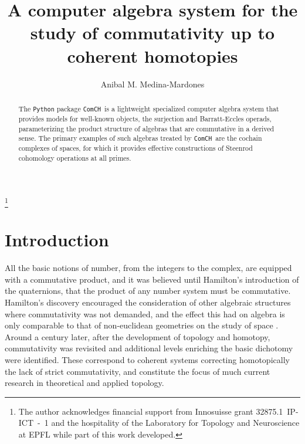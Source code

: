 \documentclass{amsart}
\newcommand{\comch}{\texttt{ComCH}}
\begin{document}
	
\title[A C.A.S. for the study of commutativity up to coherent homotopies]{A computer algebra system for the study of commutativity up to coherent homotopies}
\author{Anibal M. Medina-Mardones}
\address{Max Plank Institute for Mathematics, Bonn, Germany}
\address{Department of Mathematics, University of Notre Dame, Notre Dame, IN, USA}
\thanks{The author acknowledges financial support from Innosuisse grant \mbox{32875.1 IP-ICT - 1} and the hospitality of the Laboratory for Topology and Neuroscience at EPFL while part of this work developed.}

\begin{abstract}
	The \texttt{Python} package \comch\, is a lightweight specialized computer algebra system that provides models for well-known objects, the surjection and Barratt-Eccles operads, parameterizing the product structure of algebras that are commutative in a derived sense.
	The primary examples of such algebras treated by \comch\, are the cochain complexes of spaces, for which it provides effective constructions of Steenrod cohomology operations at all primes.
\end{abstract} 

\vspace*{-.8cm}

\maketitle

\section{Introduction}

All the basic notions of number, from the integers to the complex, are equipped with a commutative product, and it was believed until Hamilton's introduction of the quaternions, that the product of any number system must be commutative.
Hamilton's discovery encouraged the consideration of other algebraic structures where commutativity was not demanded, and the effect this had on algebra is only comparable to that of non-euclidean geometries on the study of space \cite[Ch.V]{Kline1982}.
Around a century later, after the development of topology and homotopy, commutativity was revisited and additional levels enriching the basic dichotomy were identified.
These correspond to coherent systems correcting homotopically the lack of strict commutativity, and constitute the focus of much current research in theoretical and applied topology.
\end{document}
